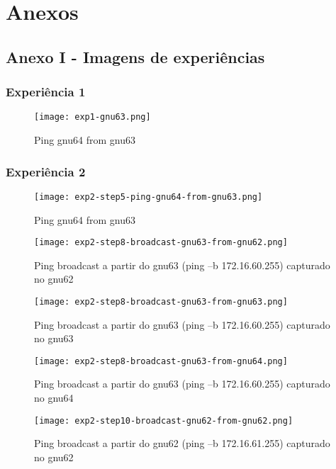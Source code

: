 \documentclass[article, a4paper, 11pt, oneside]{memoir}
\begin{document}
\newpage
\chapter[Anexos][Anexos]{Anexos} \label{\thechapter}

\section{Anexo I - Imagens de experiências}
\subsection{Experiência 1}

\begin{figure}[h]
	\centering
\texttt{[image: exp1-gnu63.png]}
\caption{Ping gnu64 from gnu63}
\end{figure}

\subsection{Experiência 2}
\begin{figure}[h]
	\centering
\texttt{[image: exp2-step5-ping-gnu64-from-gnu63.png]}
\caption{Ping gnu64 from gnu63}
\end{figure}

\newpage
\begin{figure}[h]
	\centering
\texttt{[image: exp2-step8-broadcast-gnu63-from-gnu62.png]}
\caption{Ping broadcast a partir do gnu63 (ping –b 172.16.60.255) capturado no gnu62}
\end{figure}


\begin{figure}[h]
	\centering
\texttt{[image: exp2-step8-broadcast-gnu63-from-gnu63.png]}
\caption{Ping broadcast a partir do gnu63 (ping –b 172.16.60.255) capturado no gnu63}
\end{figure}

\begin{figure}[h]
	\centering
\texttt{[image: exp2-step8-broadcast-gnu63-from-gnu64.png]}
\caption{Ping broadcast a partir do gnu63 (ping –b 172.16.60.255) capturado no gnu64}
\end{figure}

\newpage
\begin{figure}[h]
	\centering
\texttt{[image: exp2-step10-broadcast-gnu62-from-gnu62.png]}
\caption{Ping broadcast a partir do gnu62 (ping –b 172.16.61.255) capturado no gnu62}
\end{figure}
\end{document}
